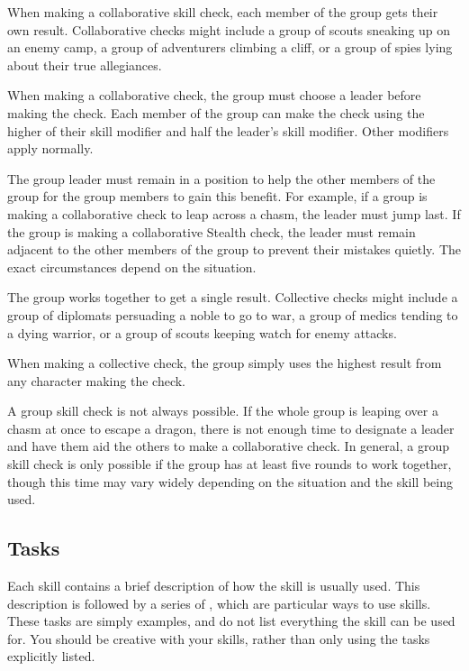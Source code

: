              When making a collaborative skill check, each member of the group gets their own result. Collaborative checks might include a group of scouts sneaking up on an enemy camp, a group of adventurers climbing a cliff, or a group of spies lying about their true allegiances.

            When making a collaborative check, the group must choose a leader before making the check.
            Each member of the group can make the check using the higher of their skill modifier and half the leader's skill modifier. Other modifiers apply normally.

            The group leader must remain in a position to help the other members of the group for the group members to gain this benefit. For example, if a group is making a collaborative check to leap across a chasm, the leader must jump last. If the group is making a collaborative Stealth check, the leader must remain adjacent to the other members of the group to prevent their mistakes quietly. The exact circumstances depend on the situation.

             The group works together to get a single result. Collective checks might include a group of diplomats persuading a noble to go to war, a group of medics tending to a dying warrior, or a group of scouts keeping watch for enemy attacks.

            When making a collective check, the group simply uses the highest result from any character making the check.

             A group skill check is not always possible. If the whole group is leaping over a chasm at once to escape a dragon, there is not enough time to designate a leader and have them aid the others to make a collaborative check. In general, a group skill check is only possible if the group has at least five rounds to work together, though this time may vary widely depending on the situation and the skill being used.

    \subsection{Tasks}\label{Tasks}

        Each skill contains a brief description of how the skill is usually used.
        This description is followed by a series of , which are particular ways to use skills.
        These tasks are simply examples, and do not list everything the skill can be used for.
        You should be creative with your skills, rather than only using the tasks explicitly listed.

